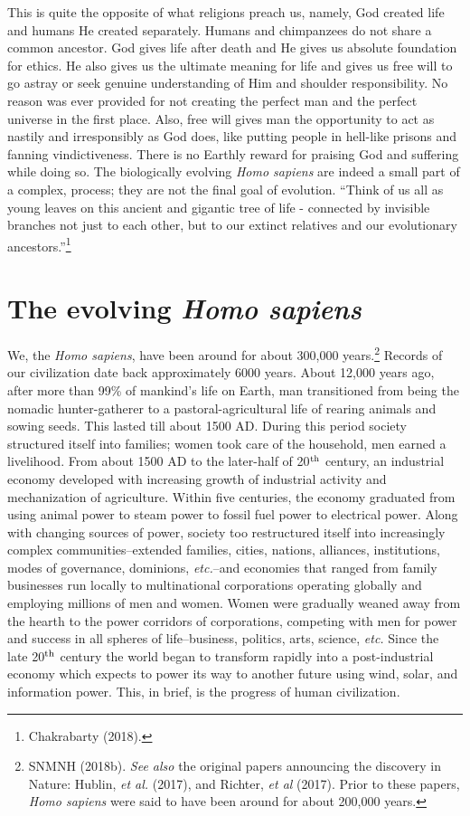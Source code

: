 \begin{multicols}{2}
This is quite the opposite of what religions preach us, namely, God created life and humans He created separately. Humans and chimpanzees do not share a common ancestor. God gives life after death and He gives us absolute foundation for ethics. He also gives us the ultimate meaning for life and gives us free will to go astray or seek genuine understanding of Him and shoulder responsibility. No reason was ever provided for not creating the perfect man and the perfect universe in the first place. Also, free will gives man the opportunity to act as nastily and irresponsibly as God does, like putting people in hell-like prisons and fanning vindictiveness. There is no Earthly reward for praising God and suffering while doing so. The biologically evolving \textit{Homo sapiens} are indeed a small part of a complex, process; they are not the final goal of evolution. “Think of us all as young leaves on this ancient and gigantic tree of life - connected by invisible branches not just to each other, but to our extinct relatives and
our evolutionary ancestors.”\footnote{Chakrabarty (2018).}

\section{The evolving \textit{Homo sapiens}}

We, the \textit{Homo sapiens}, have been around for about 300,000 years.\footnote{SNMNH (2018b). \textit{See also} the original papers announcing the discovery in Nature: Hublin, \textit{et al.} (2017), and Richter, \textit{et al} (2017). Prior to these papers, \textit{Homo sapiens} were said to have been around for about 200,000 years.} Records of our civilization date back approximately 6000 years. About 12,000 years ago, after more than 99\% of mankind's life on Earth, man transitioned from being the nomadic hunter-gatherer to a pastoral-agricultural life of rearing animals and sowing seeds. This lasted till about 1500 AD. During this period society structured itself into families; women took care of the household, men earned a livelihood. From about 1500 AD to the later-half of 20$^{\rm th}$ century, an industrial economy developed with increasing growth of industrial activity and mechanization of agriculture. Within five centuries, the economy graduated from using animal power to steam power to fossil fuel power to electrical power. Along with changing sources of power, society too restructured itself into increasingly complex communities--extended families, cities, nations, alliances, institutions, modes of governance, dominions, \textit{etc.}--and economies that ranged from family businesses run locally to multinational corporations operating globally and employing millions of men and women. Women were gradually weaned away from the hearth to the power corridors of corporations, competing with men for power and success in all spheres of life--business, politics, arts, science, \textit{etc.} Since the late 20$^{\rm th}$ century the world began to transform rapidly into a post-industrial economy which expects to power its way to another future using wind, solar, and information power. This, in brief, is the progress of human civilization.


\end{multicols}
